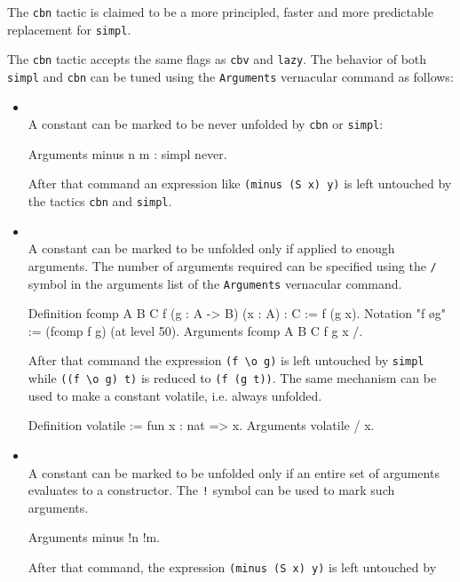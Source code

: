 The \texttt{cbn} tactic is claimed to be a more principled, faster and more
predictable replacement for \texttt{simpl}.

The \texttt{cbn} tactic accepts the same flags as \texttt{cbv} and
\texttt{lazy}.  The behavior of both \texttt{simpl} and \texttt{cbn}
can be tuned using the \texttt{Arguments} vernacular command as
follows: 
\begin{itemize}
\item {}\\
A constant can be marked to be never unfolded by \texttt{cbn} or
\texttt{simpl}:
\begin{coq_example*}
Arguments minus n m : simpl never.
\end{coq_example*}
After that command an expression like \texttt{(minus (S x) y)} is left
untouched by the tactics \texttt{cbn} and \texttt{simpl}.
\item {}\\
A constant can be marked to be unfolded only if applied to enough arguments.
The number of arguments required can be specified using
the {\tt /} symbol in the arguments list of the {\tt Arguments} vernacular
command.
\begin{coq_example*}
Definition fcomp A B C f (g : A -> B) (x : A) : C := f (g x).
Notation "f \o g" := (fcomp f g) (at level 50).
Arguments fcomp {A B C} f g x /.
\end{coq_example*}
After that command the expression {\tt (f \verb+\+o g)} is left untouched by
{\tt simpl} while {\tt ((f \verb+\+o g) t)} is reduced to {\tt (f (g t))}.
The same mechanism can be used to make a constant volatile, i.e. always
unfolded.
\begin{coq_example*}
Definition volatile := fun x : nat => x.
Arguments volatile / x.
\end{coq_example*}
\item {}\\
A constant can be marked to be unfolded only if an entire set of arguments
evaluates to a constructor. The {\tt !} symbol can be used to mark such
arguments.
\begin{coq_example*}
Arguments minus !n !m.
\end{coq_example*}
After that command, the expression {\tt (minus (S x) y)} is left untouched by

\end{itemize}
